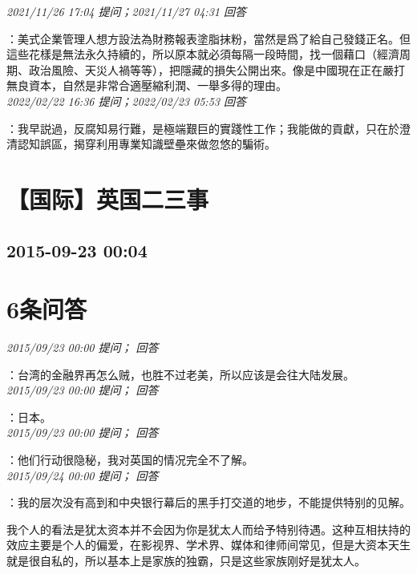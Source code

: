 \documentclass[twocolumn]{ctexart}
\begin{document}
\textit{\hfill\noindent\small 2021/11/26 17:04 提问；2021/11/27 04:31 回答}

：美式企業管理人想方設法為財務報表塗脂抹粉，當然是爲了給自己發錢正名。但這些花樣是無法永久持續的，所以原本就必須每隔一段時間，找一個藉口（經濟周期、政治風險、天災人禍等等），把隱藏的損失公開出來。像是中國現在正在嚴打無良資本，自然是非常合適壓縮利潤、一舉多得的理由。
\\

\textit{\hfill\noindent\small 2022/02/22 16:36 提问；2022/02/23 05:53 回答}

：我早説過，反腐知易行難，是極端艱巨的實踐性工作；我能做的貢獻，只在於澄清認知誤區，揭穿利用專業知識壁壘來做忽悠的騙術。
\\


\section{【国际】英国二三事}
\subsection{2015-09-23 00:04}


\section{6条问答}

\textit{\hfill\noindent\small 2015/09/23 00:00 提问； 回答}

：台湾的金融界再怎么贼，也胜不过老美，所以应该是会往大陆发展。\\

\textit{\hfill\noindent\small 2015/09/23 00:00 提问； 回答}

：日本。\\

\textit{\hfill\noindent\small 2015/09/23 00:00 提问； 回答}

：他们行动很隐秘，我对英国的情况完全不了解。\\

\textit{\hfill\noindent\small 2015/09/24 00:00 提问； 回答}

：我的层次没有高到和中央银行幕后的黑手打交道的地步，不能提供特别的见解。

我个人的看法是犹太资本并不会因为你是犹太人而给予特别待遇。这种互相扶持的效应主要是个人的偏爱，在影视界、学术界、媒体和律师间常见，但是大资本天生就是很自私的，所以基本上是家族的独霸，只是这些家族刚好是犹太人。\\
\end{document}
